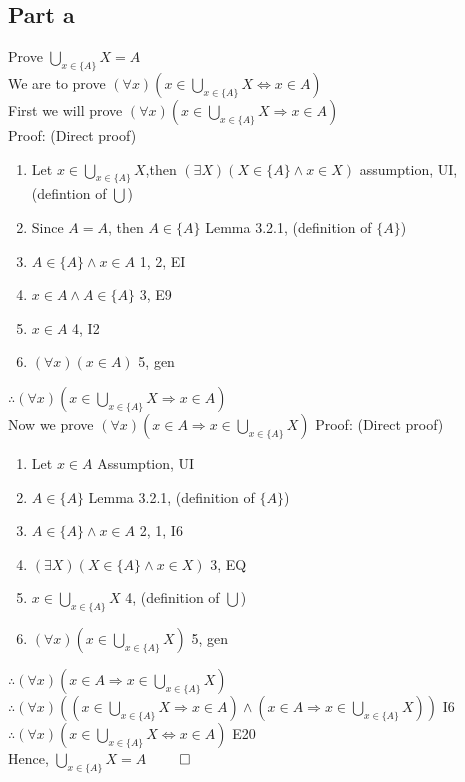 \documentclass{article}
\begin{document}
		\subsection{Part a}
			Prove $\bigcup\limits_{x \in \{A\}} X = A$ \\
			We are to prove $(\forall x)(x \in \bigcup\limits_{x \in \{A\}} X \Leftrightarrow x \in A)$ \\
			First we will prove $(\forall x)(x \in \bigcup\limits_{x \in \{A\}} X \Rightarrow x \in A)$ \\
			Proof: (Direct proof)
			\begin{enumerate}
				\item Let $x \in \bigcup\limits_{x \in \{A\}} X$,then $(\exists X)(X \in \{A\} \land x \in X)$ \hfill assumption, UI, (defintion of $\bigcup$)
				\item Since $A = A$, then $A \in \{A\}$ \hfill Lemma 3.2.1, (definition of $\{A\}$)
				\item $A \in \{A\} \land x \in A$ \hfill 1, 2, EI
				\item $x \in A \land A \in \{A\}$ \hfill 3, E9
				\item $x \in A$ \hfill 4, I2
				\item $(\forall x)(x \in A)$ \hfill 5, gen
			\end{enumerate}
			$\therefore (\forall x)(x \in \bigcup\limits_{x \in \{A\}} X \Rightarrow x \in A)$ \\
			Now we prove $(\forall x)(x \in A \Rightarrow x \in \bigcup\limits_{x \in \{A\}} X)$
			Proof: (Direct proof)
			\begin{enumerate}
				\item Let $x \in A$ \hfill Assumption, UI
				\item $A \in \{A\}$ \hfill Lemma 3.2.1, (definition of $\{A\}$)
				\item $A \in \{A\} \land x \in A$ \hfill 2, 1, I6
				\item $(\exists X)(X \in \{A\} \land x \in X)$ \hfill 3, EQ
				\item $x \in \bigcup\limits_{x \in \{A\}} X$ \hfill 4, (definition of $\bigcup$)
				\item $(\forall x)(x \in \bigcup\limits_{x \in \{A\}} X)$ \hfill 5, gen
			\end{enumerate}
			$\therefore (\forall x)(x \in A \Rightarrow x \in \bigcup\limits_{x \in \{A\}} X)$ \\
			$\therefore (\forall x)((x \in \bigcup\limits_{x \in \{A\}} X \Rightarrow x \in A) \land (x \in A \Rightarrow x \in \bigcup\limits_{x \in \{A\}} X))$ \hfill I6\\
			$\therefore (\forall x)(x \in \bigcup\limits_{x \in \{A\}} X \Leftrightarrow x \in A)$ \hfill E20 \\
			Hence, $\bigcup\limits_{x \in \{A\}} X = A$ \hfill $\qed$
\end{document}
